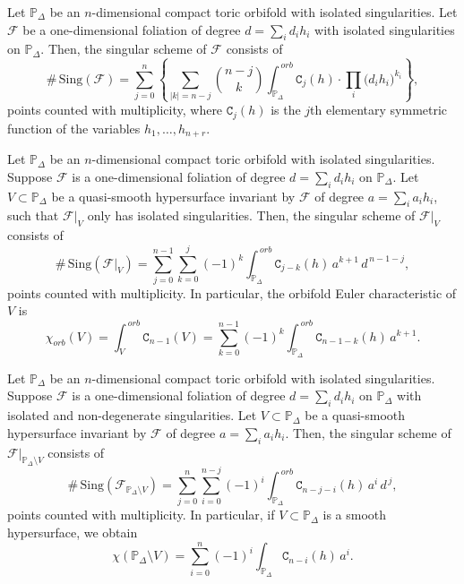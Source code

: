\documentclass[10pt,a4paper]{amsart}
\begin{document}
\begin{prop} \label{pro1} Let $\mathbb{P}_{\Delta}$ be an $n$-dimensional compact toric orbifold with isolated singularities.
Let $\mathcal{F}$ be a one-dimensional foliation of degree $d=\sum_{i}d_{i} h_i$
with isolated singularities on $\mathbb{P}_{\Delta}$. Then, the singular scheme of $\mathcal{F}$ consists of
$$\#\,\mathrm{Sing}(\mathcal{F})
=\sum_{j=0}^{n}\left\{\sum_{\left|k\right|=n-j}\binom{n-j}{k} \int_{\mathbb{P}_{\Delta}}^{\,orb} 
\texttt{C}_j(h)\cdot \prod_i \big(d_ih_i\big)^{k_i}\right\},$$ %
points counted with multiplicity, where $\texttt{C}_j(h)$ is the $j$th elementary symmetric function
of the variables $h_1,\ldots,h_{n+r}$.
\end{prop}

\begin{prop} \label{pro2} Let $\mathbb{P}_{\Delta}$ be an $n$-dimensional compact toric orbifold with isolated singularities.
Suppose $\mathcal{F}$ is a one-dimensional foliation of degree $d=\sum_{i}d_{i} h_i$
on $\mathbb{P}_{\Delta}$. Let $V \subset \mathbb{P}_{\Delta}$ be a quasi-smooth hypersurface invariant by $\mathcal{F}$ 
of degree $a=\sum_{i}a_{i} h_i$, such that $\mathcal{F}|_V$ only has isolated singularities. 
Then, the singular scheme of $\mathcal{F}|_V$ consists of
$$\#\,\mathrm{Sing}(\mathcal{F}|_V)
=\sum_{j=0}^{n-1} \sum_{k=0}^{j}(-1)^{k}\int_{\mathbb{P}_{\Delta}}^{\,orb}\texttt{C}_{j-k}(h)\,a^{k+1}\,d^{\,n-1-j},$$
points counted with multiplicity. In particular, the orbifold Euler characteristic of $V$ is 
$$\chi_{orb}(V)=\int_V^{\,orb} \texttt{C}_{n-1}(V)
=\sum_{k=0}^{n-1}(-1)^{k}\int_{\mathbb{P}_{\Delta}}^{\,orb}\texttt{C}_{n-1-k}(h)\,a^{k+1}.$$
\end{prop}

\begin{teo} \label{aa} Let $\mathbb{P}_{\Delta}$ be an $n$-dimensional compact toric orbifold with isolated singularities.
Suppose $\mathcal{F}$ is a one-dimensional foliation of degree $d=\sum_{i}d_{i} h_i$ on $\mathbb{P}_{\Delta}$
with isolated and non-degenerate singularities. 
Let $V \subset \mathbb{P}_{\Delta}$ be a quasi-smooth hypersurface invariant by $\mathcal{F}$ of degree $a=\sum_{i}a_{i} h_i$. Then,
the singular scheme of $\mathcal{F}|_{\mathbb{P}_{\Delta}\setminus V}$ consists of
$$\#\,\mathrm{Sing}(\mathcal{F}_{\mathbb{P}_{\Delta}\setminus V})
=\sum_{j=0}^{n}\sum_{i=0}^{n-j}(-1)^{i}\int_{\mathbb{P}_{\Delta}}^{\,orb}\texttt{C}_{n-j-i}(h)\,a^{i}\,d^{\,j},$$
points counted with multiplicity. In particular, if 
$V \subset \mathbb{P}_{\Delta}$ is a smooth hypersurface, we obtain 
$$\chi(\mathbb{P}_{\Delta}\setminus V)=\sum_{i=0}^n(-1)^{i}\int_{\mathbb{P}_{\Delta}}\texttt{C}_{n-i}(h)\,a^{i}.$$
\end{teo}
\end{document}
